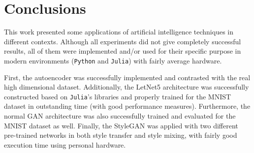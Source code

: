 \documentclass[conference]{IEEEtran}
\theoremstyle{definition}
\theoremstyle{remark}
\theoremstyle{remark}
\begin{document}
\section{Conclusions}\label{sec:conc}

This work presented some applications of artificial intelligence techniques in
different contexts. Although all experiments did not give completely successful
results, all of them were implemented and/or used for their specific purpose in
modern environments (\texttt{Python} and \texttt{Julia}) with fairly average
hardware.

First, the autoencoder was successfully implemented and contrasted with the real
high dimensional dataset. Additionally, the LetNet5 architecture was
successfully constructed based on \texttt{Julia}'s libraries and properly
trained for the MNIST dataset in outstanding time (with good performance
measures). Furthermore, the normal GAN architecture was also successfully
trained and evaluated for the MNIST dataset as well. Finally, the StyleGAN was
applied with two different pre-trained networks in both style transfer and style
mixing, with fairly good execution time using personal hardware.

\newpage
\printbibliography
\end{document}
